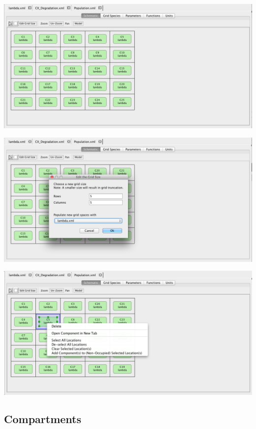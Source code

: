 \documentclass[titlepage,11pt]{article}
\begin{document}
\begin{center}
\includegraphics[width=140mm]{screenshots/gridModel}
\end{center}

\begin{center}
\includegraphics[width=140mm]{screenshots/editGridSize}
\end{center}

\begin{center}
\includegraphics[width=140mm]{screenshots/gridRightButton}
\end{center}

\subsection{\label{Compartments}Compartments}
\end{document}
